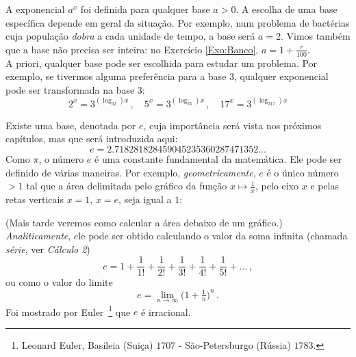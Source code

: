 A exponencial $a^x$ foi definida para qualquer base $a>0$. 
A escolha de uma base específica depende em geral da situação. Por exemplo, num
problema 
de bactérias cuja população \emph{dobra} a cada unidade de tempo, a base será
$a=2$. 
Vimos também que a base não precisa ser inteira: no Exercício 
\ref{Exo:Banco}, $a=1+\frac{r}{100}$.\\

A priori, qualquer base pode ser escolhida para estudar um problema. Por
exemplo, se tivermos alguma preferência para a base $3$, qualquer exponencial
pode ser transformada na base $3$:
$$
2^x=3^{(\log_32)x}\,,\quad 5^x=3^{(\log_35)x}\,,\quad
17^x=3^{(\log_317) x}
$$

Existe uma base, denotada por $e$, cuja importância será vista nos próximos
capítulos, mas que será introduzida aqui:
$$e=2.718281828459045235360287471352...$$
Como $\pi$, o número $e$ é uma constante fundamental da matemática. Ele pode ser
definido de várias maneiras. Por exemplo, 
\emph{geometricamente}, $e$ é o único número $>1$ tal que a área delimitada pelo
gráfico da função $x\mapsto \frac1x$, pelo eixo $x$ e pelas retas verticais
$x=1$, $x=e$, seja igual a $1$:
\begin{center}
\begin{bmlimage}\end{bmlimage}
\end{center}
(Mais tarde veremos como calcular a área debaixo de um gráfico.)
\emph{Analiticamente}, $e$le pode ser obtido calculando o valor da soma infinita
(chamada \emph{série}, ver \emph{Cálculo 2})
$$e=1+\frac{1}{1!}+\frac{1}{2!}+\frac{1}{3!}+\frac{1}{4!}+\frac{1}{5!}+\dots\,,
$$
ou como o valor do limite
\begin{equation}\label{eq_def_e}
e=\lim_{n\to \infty}\bigl(1+\tfrac{1}{n}\bigr)^n\,.
\end{equation}
Foi mostrado por Euler~\footnote{Leonard Euler, Basileia (Suiça) $1707$ -
São-Petersburgo (Rússia) $1783$.} que $e$ é irracional.\\

